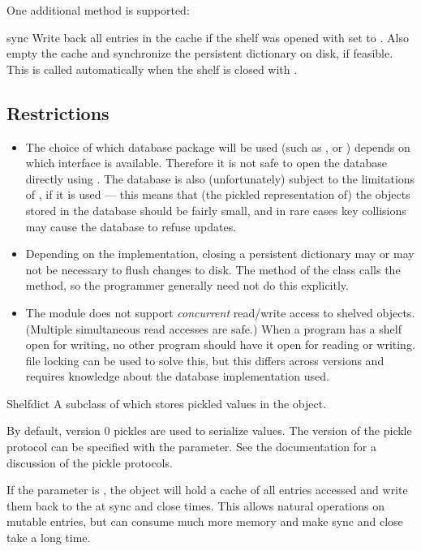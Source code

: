 One additional method is supported:
\begin{methoddesc}[Shelf]{sync}{}
Write back all entries in the cache if the shelf was opened with
 set to . Also empty the cache and synchronize
the persistent dictionary on disk, if feasible.  This is called automatically
when the shelf is closed with .
\end{methoddesc}

\subsection{Restrictions}

\begin{itemize}

\item
The choice of which database package will be used
(such as ,  or ) depends on
which interface is available.  Therefore it is not safe to open the database
directly using .  The database is also (unfortunately) subject
to the limitations of , if it is used --- this means
that (the pickled representation of) the objects stored in the
database should be fairly small, and in rare cases key collisions may
cause the database to refuse updates.

\item
Depending on the implementation, closing a persistent dictionary may
or may not be necessary to flush changes to disk.  The 
method of the  class calls the  method, so the
programmer generally need not do this explicitly.

\item
The  module does not support \emph{concurrent} read/write
access to shelved objects.  (Multiple simultaneous read accesses are
safe.)  When a program has a shelf open for writing, no other program
should have it open for reading or writing.  \UNIX{} file locking can
be used to solve this, but this differs across \UNIX{} versions and
requires knowledge about the database implementation used.

\end{itemize}

\begin{classdesc}{Shelf}{dict}
A subclass of  which stores pickled values in the
 object.  

By default, version 0 pickles are used to serialize values.  The
version of the pickle protocol can be specified with the
 parameter. See the  documentation for a
discussion of the pickle protocols. 

If the  parameter is , the object will hold a
cache of all entries accessed and write them back to the  at
sync and close times.  This allows natural operations on mutable entries,
but can consume much more memory and make sync and close take a long time.
\end{classdesc}

